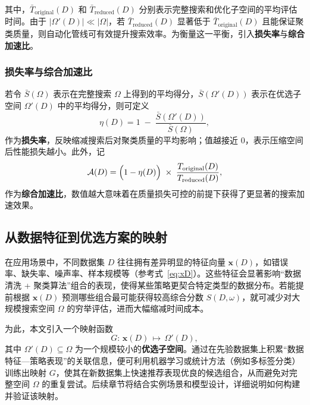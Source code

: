 \documentclass[10pt]{article} %
\numberwithin{equation}{section}
\begin{document}
其中，\(\bar{T}_{\text{original}}(D)\) 和 \(\bar{T}_{\text{reduced}}(D)\) 分别表示完整搜索和优化子空间的平均评估时间。由于 \(|\Omega'(D)| \ll |\Omega|\)，若 \(\bar{T}_{\text{reduced}}(D)\) 显著低于 \(\bar{T}_{\text{original}}(D)\) 且能保证聚类质量，则自动化管线可有效提升搜索效率。为衡量这一平衡，引入\textbf{损失率}与\textbf{综合加速比}。

\subsubsection*{损失率与综合加速比}
若令 \(\bar{S}(\Omega)\) 表示在完整搜索 \(\Omega\) 上得到的平均得分，\(\bar{S}(\Omega'(D))\) 表示在优选子空间 \(\Omega'(D)\) 中的平均得分，则可定义
\begin{equation}\label{eq:loss-rate}
  \eta(D)
  =
  1 \;-\;
  \frac{\bar{S}(\Omega'(D))}{\bar{S}(\Omega)},
\end{equation}
作为\textbf{损失率}，反映缩减搜索后对聚类质量的平均影响；值越接近 0，表示压缩空间后性能损失越小。此外，记
\begin{equation}\label{eq:acc-ratio}
  \mathcal{A}(D)
  =
  \Bigl(1 - \eta(D)\Bigr)
  \;\times\;
  \frac{T_{\text{original}}(D)}{T_{\text{reduced}}(D)},
\end{equation}
作为\textbf{综合加速比}，数值越大意味着在质量损失可控的前提下获得了更显著的搜索加速效果。

\subsection{从数据特征到优选方案的映射}
\label{subsec:mapping-model}

在应用场景中，不同数据集 \(D\) 往往拥有差异明显的特征向量 \(\mathbf{x}(D)\)，如错误率、缺失率、噪声率、样本规模等（参考式~\eqref{eq:xD}）。这些特征会显著影响“数据清洗 + 聚类算法”组合的表现，使得某些策略更契合特定类型的数据分布。若能提前根据 \(\mathbf{x}(D)\) 预测哪些组合最可能获得较高综合分数 \(S(D,\omega)\)，就可减少对大规模搜索空间 \(\Omega\) 的穷举评估，进而大幅缩减时间成本。

为此，本文引入一个映射函数
\begin{equation}\label{eq:Omega-prime}
  G:\, \mathbf{x}(D)\,\mapsto\, \Omega'(D),
\end{equation}
其中 \(\Omega'(D)\subseteq \Omega\) 为一个规模较小的\textbf{优选子空间}。通过在先验数据集上积累“数据特征—策略表现”的关联信息，便可利用机器学习或统计方法（例如多标签分类）训练出映射 \(G\)，使其在新数据集上快速推荐表现优良的候选组合，从而避免对完整空间 \(\Omega\) 的重复尝试。后续章节将结合实例场景和模型设计，详细说明如何构建并验证该映射。
\end{document}

